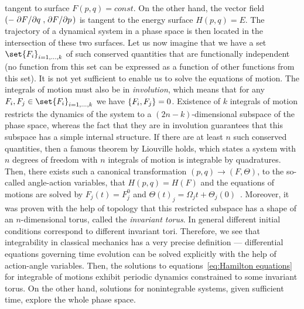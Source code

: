 tangent to surface \(F(p,q) = const\). On the other hand, the vector field 
\(\left(-\pdv*{F}{q},\pdv*{F}{p}\right)\) is tangent to the energy surface \(H(p,q) = E\).
The trajectory of a dynamical system in a phase space is then located in the intersection
of these two surfaces.
Let us now imagine that we have a set \(\set{F_i}_{i=1,\ldots,k}\) of such conserved
quantities that are functionally independent (no function from this set can be expressed
as a function of other functions from this set). It is not yet sufficient to enable us to solve
the equations of motion. The integrals of motion must also be in \textit{involution},
which means that for any \(F_i,F_j\in\set{F_i}_{i=1,\ldots,k}\) we have
\(\poissonbracket{F_i}{F_j} = 0\). Existence of \(k\) integrals of motion restricts
the dynamics of the system to a \((2n-k)\)-dimensional subspace of the phase space, whereas the fact
that they are in involution guarantees that this subspace has a simple internal structure.
If there are at least \(n\) such conserved quantities, then a famous theorem by
Liouville holds, which states a system with \(n\) degrees of freedom with
\(n\) integrals of motion is integrable by quadratures.
Then, there exists such a canonical transformation \((p,q)\to (F,\Theta)\), to the
so-called angle-action variables, that \(H(p,q) = H(F)\) and the equations
of motions are solved by \(F_j(t) = F_j^0\) and \({\Theta(t)}_j = \Omega_j t + \Theta_j(0)\)~\autocite{arnold2013mathematical}.
Moreover, it was proven with the help of topology that this restricted subspace
has a shape of an \(n\)-dimensional torus, called the \textit{invariant torus}. In
general different initial conditions correspond to different invariant tori.
Therefore, we see that integrability in classical mechanics has a very precise 
definition --- differential equations governing time evolution can be solved explicitly
with the help of action-angle variables. Then, the solutions to equations~\ref{eq:Hamilton equations}
for integrable of motions exhibit periodic dynamics constrained to some invariant torus.
On the other hand, solutions for nonintegrable systems, given sufficient time, explore the whole
phase space.

